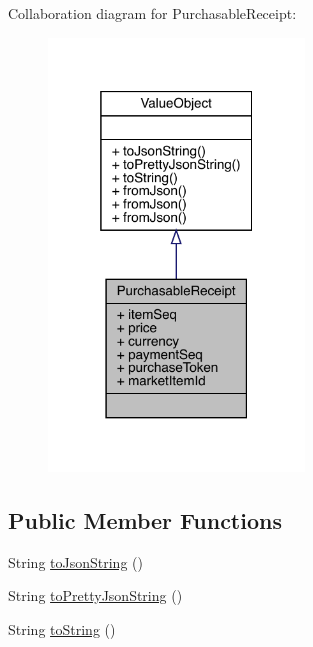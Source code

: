 Collaboration diagram for Purchasable\+Receipt\+:
\nopagebreak
\begin{figure}[H]
\begin{center}
\leavevmode
\includegraphics[width=193pt]{classcom_1_1toast_1_1android_1_1gamebase_1_1base_1_1purchase_1_1_purchasable_receipt__coll__graph}
\end{center}
\end{figure}
\subsection*{Public Member Functions}
\begin{DoxyCompactItemize}
\item 
String \hyperlink{classcom_1_1toast_1_1android_1_1gamebase_1_1base_1_1_value_object_a58acf6402880e9769d79d8667581fa6a}{to\+Json\+String} ()
\item 
String \hyperlink{classcom_1_1toast_1_1android_1_1gamebase_1_1base_1_1_value_object_a054431f3d988a22295cfc8b784ff2637}{to\+Pretty\+Json\+String} ()
\item 
String \hyperlink{classcom_1_1toast_1_1android_1_1gamebase_1_1base_1_1_value_object_ad146fa8579a5f8a876c4688cc5a68520}{to\+String} ()
\end{DoxyCompactItemize}
